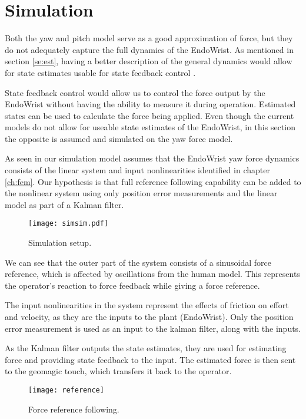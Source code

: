 \section{Simulation}
Both the yaw and pitch model serve as a good approximation of force, but they do not adequately capture the full dynamics of the EndoWrist.
As mentioned in section \ref{se:est}, having a better description of the general dynamics would allow for state estimates usable for state feedback control \cite{yue2004state}.

State feedback control would allow us to control the force output by the EndoWrist without having the ability to measure it during operation.
Estimated states can be used to calculate the force being applied.
Even though the current models do not allow for useable state estimates of the EndoWrist, in this section the opposite is assumed and simulated on the yaw force model.

As seen in  our simulation model assumes that the EndoWrist yaw force dynamics consists of the linear system and input nonlinearities identified in chapter \ref{ch:fem}.
Our hypothesis is that full reference following capability can be added to the nonlinear system using only position error measurements and the linear model as part of a Kalman filter.

\begin{figure}[H]
\centering
\texttt{[image: simsim.pdf]}
\caption{Simulation setup.}
\label{mdle}
\end{figure}

We can see that the outer part of the system consists of a sinusoidal force reference, which is affected by oscillations from the human model. 
This represents the operator's reaction to force feedback while giving a force reference.

The input nonlinearities in the system represent the effects of friction on effort and velocity, as they are the inputs to the plant (EndoWrist).
Only the position error measurement is used as an input to the kalman filter, along with the inputs.

As the Kalman filter outputs the state estimates, they are used for estimating force and providing state feedback to the input.
The estimated force is then sent to the geomagic touch, which transfers it back to the operator.

\begin{figure}[H]
\centering
\hspace{-2.5em}\texttt{[image: reference]}
\caption{Force reference following.}
\label{fig:freffl}
\end{figure}

